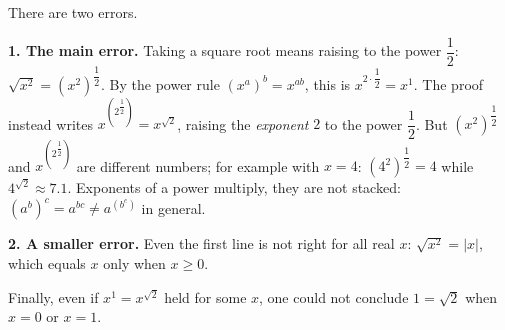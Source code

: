 There are two errors.

\textbf{1. The main error.} Taking a square root means raising to the power $\dfrac{1}{2}$: $\sqrt{x^2}=\left(x^2\right)^{\dfrac{1}{2}}$. By the power rule $\left(x^a\right)^b=x^{ab}$, this is $x^{2\cdot\dfrac{1}{2}}=x^1$. The proof instead writes $x^{\left(2^{\dfrac{1}{2}}\right)}=x^{\sqrt2}$, raising the \emph{exponent} $2$ to the power $\dfrac{1}{2}$. But $\left(x^2\right)^{\dfrac{1}{2}}$ and $x^{\left(2^{\dfrac{1}{2}}\right)}$ are different numbers; for example with $x=4$: $\left(4^2\right)^{\dfrac{1}{2}}=4$ while $4^{\sqrt2}\approx7.1$. Exponents of a power multiply, they are not stacked: $(a^b)^c=a^{bc}\ne a^{\left(b^c\right)}$ in general.

\textbf{2. A smaller error.} Even the first line is not right for all real $x$: $\sqrt{x^2}=|x|$, which equals $x$ only when $x\ge0$.

Finally, even if $x^1=x^{\sqrt2}$ held for some $x$, one could not conclude $1=\sqrt2$ when $x=0$ or $x=1$.
